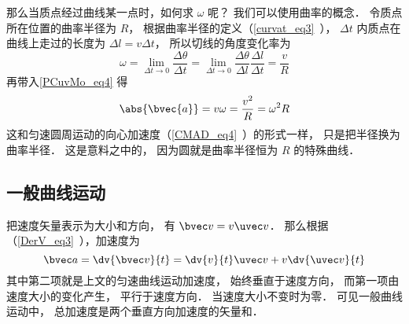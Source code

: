 那么当质点经过曲线某一点时，如何求 $\omega$ 呢？ 我们可以使用曲率的概念． 令质点所在位置的曲率半径为 $R$， 根据曲率半径的定义（\autoref{curvat_eq3}~）， $\Delta t$ 内质点在曲线上走过的长度为 $\Delta l = v \Delta t$， 所以切线的角度变化率为
\begin{equation}
\omega = \lim_{\Delta t\to 0}\frac{\Delta \theta}{\Delta t} = \lim_{\Delta t\to 0}\frac{\Delta \theta}{\Delta l} \frac{\Delta l}{\Delta t} = \frac{v}{R}
\end{equation}
再带入\autoref{PCuvMo_eq4} 得
\begin{equation}\label{PCuvMo_eq3}
\abs{\bvec{a}} = v\omega = \frac{v^2}{R} = \omega^2 R
\end{equation}
这和匀速圆周运动的向心加速度（\autoref{CMAD_eq4}~）的形式一样， 只是把半径换为曲率半径． 这是意料之中的， 因为圆就是曲率半径恒为 $R$ 的特殊曲线．

\subsection{一般曲线运动}
把速度矢量表示为大小和方向， 有 $\bvec v = v\uvec v$． 那么根据（\autoref{DerV_eq3}~），加速度为
\begin{equation}
\bvec a = \dv{\bvec v}{t} = \dv{v}{t}\uvec v + v\dv{\uvec v}{t}
\end{equation}
其中第二项就是上文的匀速曲线运动加速度， 始终垂直于速度方向， 而第一项由速度大小的变化产生， 平行于速度方向． 当速度大小不变时为零． 可见一般曲线运动中， 总加速度是两个垂直方向加速度的矢量和．
